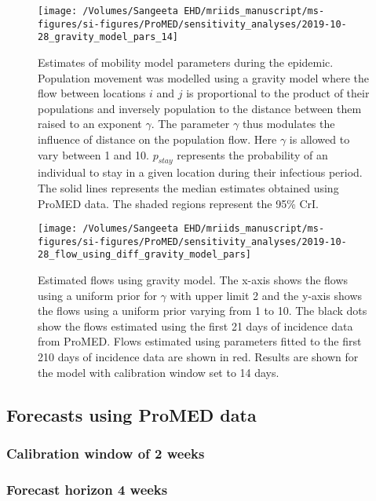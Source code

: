 \documentclass[9pt,twoside,lineno]{pnas-new}
\begin{document}
\begin{figure}
  \centering 
   \texttt{[image: /Volumes/Sangeeta EHD/mriids\_manuscript/ms-figures/si-figures/ProMED/sensitivity\_analyses/2019-10-28\_gravity\_model\_pars\_14]}
  \caption{Estimates of mobility model
  parameters during the epidemic. Population movement was modelled using a
  gravity model where the flow between locations \(i\) and \(j\) is
  proportional to the product of their populations and inversely
  population to the distance between them raised to an exponent \(\gamma\).
  The parameter \(\gamma\) thus modulates the influence of distance on the
  population flow. Here \(\gamma\) is allowed to vary between 1 and 10.
  \(p_{stay}\) represents the probability of an individual to stay in a
  given location during their infectious period. The solid lines
  represents the median estimates obtained using ProMED data. The shaded
  regions represent the 95\% CrI.}
\label{fig:parsul10}
\end{figure}\FloatBarrier

\begin{figure}
\centering
   \texttt{[image: /Volumes/Sangeeta
     EHD/mriids\_manuscript/ms-figures/si-figures/ProMED/sensitivity\_analyses/2019-10-28\_flow\_using\_diff\_gravity\_model\_pars]}
\caption{Estimated flows using gravity model. The x-axis shows the flows using a uniform
  prior for $\gamma$ with upper limit 2 and the y-axis shows the flows
  using a uniform prior varying from 1 to 10. The black dots show the
  flows estimated using the first 21 days of incidence data from ProMED. Flows
  estimated using parameters fitted to the first 210 days of incidence
  data are shown in red. Results are shown for the model with
  calibration window set to 14 days.}
\label{fig:flows2}
\end{figure}\FloatBarrier

\subsection{Forecasts using ProMED data}\label{forecasts-using-promed-data-1}
\subsubsection{Calibration window of 2 weeks}\label{sec:pm2-3-2}
\subsubsection{Forecast horizon 4 weeks}\label{forecast-horizon-4-weeks-8}
\end{document}
